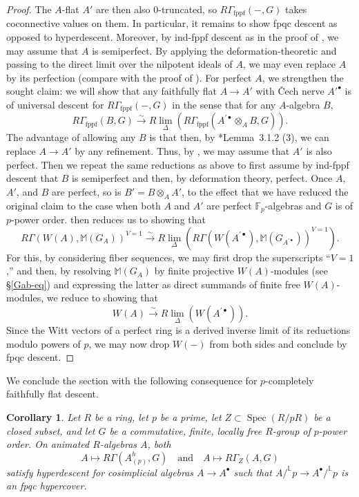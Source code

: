 \documentclass[11pt, reqno]{amsart}
\newcommand{\bF}{\mathbb{F}}
\newcommand{\bL}{\mathbb{L}}
\newcommand{\bM}{\mathbb{M}}
\DeclareMathOperator{\Spec}{Spec}		%
\newcommand{\fppf}{\mathrm{fppf}}		%
\newcommand{\isomto}{\overset{\sim}{\longrightarrow}}
\providecommand{\p}[1]{\left(#1\right)}
\newcommand{\ra}{\rightarrow}
\newcommand{\tensor}{\otimes} 			%
\providecommand{\qxq}[1]{\quad\text{#1}\quad}
\newcommand{\tst}{\textstyle}
\numberwithin{equation}{numberingbase}
\theoremstyle{thms}
\newtheorem{corollary}[numberingbase]{Corollary}
\theoremstyle{claims}
\theoremstyle{defs}
\theoremstyle{thms}
\theoremstyle{defs}
\theoremstyle{subsection-tweak}
\theoremstyle{subsection-tweak}
\begin{document}
\begin{proof}
The $A$-flat $A'$ are then also $0$-truncated, so $R\Gamma_\fppf(-, G)$ takes coconnective values on them. In particular, it remains to show fpqc descent as opposed to hyperdescent. %
Moreover, by ind-fppf descent as in the proof of , we may assume that $A$ is semiperfect. By applying the deformation-theoretic  and passing to the direct limit over the nilpotent ideals of $A$, we may even replace $A$ by its perfection (compare with the proof of ).  For perfect $A$, we strengthen the sought claim: we will show that any faithfully flat $A\ra A'$ with  \v{C}ech nerve $A'^\bullet$ is of universal descent for $R\Gamma_\fppf(-, G)$ in the sense that for any $A$-algebra $B$, 
\[
\tst R\Gamma_\fppf(B,G) \isomto  R\lim_\Delta \p{R\Gamma_\fppf(A^{\prime\bullet} \tensor_A B,G)}\!.
\]
The advantage of allowing any $B$ is that then, by \cite{LZ17}*{Lemma~3.1.2 (3)}, we can replace $A\to A'$ by any refinement. Thus, by , we may assume that $A'$ is also perfect. Then we repeat the same reductions as above to first assume by ind-fppf descent that $B$ is semiperfect and then, by deformation theory, perfect. Once $A$, $A'$, and $B$ are perfect, so is $B'=B\otimes_A A'$, to the effect that we have reduced the original claim to the case when both $A$ and $A'$ are perfect $\bF_p$-algebras and $G$ is of $p$-power order.  then reduces us to showing that
\[
\tst R\Gamma(W(A),\bM(G_A))^{V = 1} \isomto  R\lim_\Delta \p{R\Gamma(W(A^{\prime\bullet}), \bM(G_{A^{\prime\bullet}}))^{V = 1}}\!.
\]
For this, by considering fiber sequences, we may first drop the superscripts ``$V = 1$,'' and then, by resolving $\bM(G_A)$ by finite projective $W(A)$-modules (see \S\ref{Gab-eq}) and expressing the latter as direct summands of finite free $W(A)$-modules, we reduce to showing that 
\[
\tst W(A) \isomto  R\lim_\Delta \p{W(A^{\prime\bullet})}\!.
\]
Since the Witt vectors of a perfect ring is a derived inverse limit of its reductions modulo powers of $p$, we may now drop $W(-)$ from both sides and conclude by fpqc descent.
\end{proof}





We conclude the section with the following consequence for $p$-completely faithfully flat descent. 

\begin{corollary}\label{cor:descentsupport} 
Let $R$ be a ring, let $p$ be a prime, let $Z \subset \Spec(R/pR)$ be a closed subset, and let $G$ be a commutative, finite, locally free $R$-group of $p$-power order. On animated $R$-algebras $A$, both
\[
A\mapsto R\Gamma(A^h_{(p)}, G) \qxq{and} A\mapsto R\Gamma_Z(A,G)
\]
satisfy hyperdescent for cosimplicial algebras $A \ra A^\bullet$ such that $A/^\bL p \ra A^\bullet/^\bL p$ is an fpqc hypercover.
\end{corollary}
\end{document}
